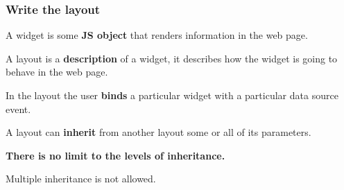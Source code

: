 \documentclass{beamer}
\begin{document}
    \begin{frame}
        \frametitle{Write the layout}
        A widget is some \textbf{JS object} that renders information in the web
        page.

        A layout is a \textbf{description} of a widget, it describes how the
        widget is going to behave in the web page.

        In  the layout the user \textbf{binds} a particular widget with a
        particular data source event.

        A layout can \textbf{inherit} from another layout some or all of its
        parameters.

        \textbf{There is no limit to the levels of inheritance.}

        Multiple inheritance is not allowed.
    \end{frame}
\end{document}
